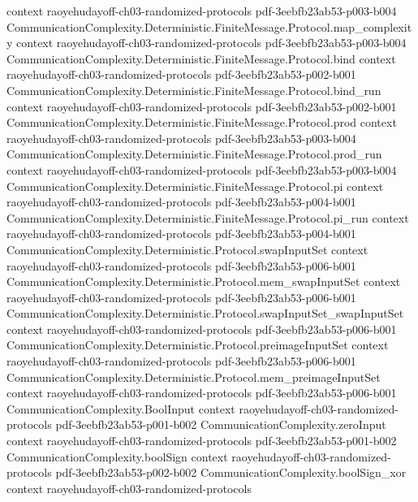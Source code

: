\begin{theorem}
  {context}
  {raoyehudayoff-ch03-randomized-protocols}
  {pdf-3eebfb23ab53-p003-b004}
\proofstep
  {CommunicationComplexity.Deterministic.FiniteMessage.Protocol.map_complexity}
  {context}
  {raoyehudayoff-ch03-randomized-protocols}
  {pdf-3eebfb23ab53-p003-b004}
\proofstep
  {CommunicationComplexity.Deterministic.FiniteMessage.Protocol.bind}
  {context}
  {raoyehudayoff-ch03-randomized-protocols}
  {pdf-3eebfb23ab53-p002-b001}
\proofstep
  {CommunicationComplexity.Deterministic.FiniteMessage.Protocol.bind_run}
  {context}
  {raoyehudayoff-ch03-randomized-protocols}
  {pdf-3eebfb23ab53-p002-b001}
\proofstep
  {CommunicationComplexity.Deterministic.FiniteMessage.Protocol.prod}
  {context}
  {raoyehudayoff-ch03-randomized-protocols}
  {pdf-3eebfb23ab53-p003-b004}
\proofstep
  {CommunicationComplexity.Deterministic.FiniteMessage.Protocol.prod_run}
  {context}
  {raoyehudayoff-ch03-randomized-protocols}
  {pdf-3eebfb23ab53-p003-b004}
\proofstep
  {CommunicationComplexity.Deterministic.FiniteMessage.Protocol.pi}
  {context}
  {raoyehudayoff-ch03-randomized-protocols}
  {pdf-3eebfb23ab53-p004-b001}
\proofstep
  {CommunicationComplexity.Deterministic.FiniteMessage.Protocol.pi_run}
  {context}
  {raoyehudayoff-ch03-randomized-protocols}
  {pdf-3eebfb23ab53-p004-b001}
\proofstep
  {CommunicationComplexity.Deterministic.Protocol.swapInputSet}
  {context}
  {raoyehudayoff-ch03-randomized-protocols}
  {pdf-3eebfb23ab53-p006-b001}
\proofstep
  {CommunicationComplexity.Deterministic.Protocol.mem_swapInputSet}
  {context}
  {raoyehudayoff-ch03-randomized-protocols}
  {pdf-3eebfb23ab53-p006-b001}
\proofstep
  {CommunicationComplexity.Deterministic.Protocol.swapInputSet_swapInputSet}
  {context}
  {raoyehudayoff-ch03-randomized-protocols}
  {pdf-3eebfb23ab53-p006-b001}
\proofstep
  {CommunicationComplexity.Deterministic.Protocol.preimageInputSet}
  {context}
  {raoyehudayoff-ch03-randomized-protocols}
  {pdf-3eebfb23ab53-p006-b001}
\proofstep
  {CommunicationComplexity.Deterministic.Protocol.mem_preimageInputSet}
  {context}
  {raoyehudayoff-ch03-randomized-protocols}
  {pdf-3eebfb23ab53-p006-b001}
\proofstep
  {CommunicationComplexity.BoolInput}
  {context}
  {raoyehudayoff-ch03-randomized-protocols}
  {pdf-3eebfb23ab53-p001-b002}
\proofstep
  {CommunicationComplexity.zeroInput}
  {context}
  {raoyehudayoff-ch03-randomized-protocols}
  {pdf-3eebfb23ab53-p001-b002}
\proofstep
  {CommunicationComplexity.boolSign}
  {context}
  {raoyehudayoff-ch03-randomized-protocols}
  {pdf-3eebfb23ab53-p002-b002}
\proofstep
  {CommunicationComplexity.boolSign_xor}
  {context}
  {raoyehudayoff-ch03-randomized-protocols}

\end{theorem}
